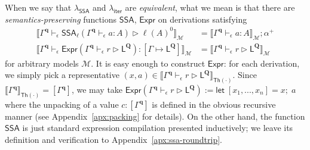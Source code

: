 \documentclass[acmsmall,screen,review]{acmart}
\newcommand{\mc}[1]{\ensuremath{\mathcal{#1}}}
\newcommand{\mb}[1]{\ensuremath{\mathbf{#1}}}
\newcommand{\ms}[1]{\ensuremath{\mathsf{#1}}}
\newcommand{\letexpr}[3]{\ensuremath{\ms{let}\;#1 = #2;\;#3}}
\newcommand{\hasty}[4]{#1 \vdash_{#2} #3: {#4}}
\newcommand{\haslb}[4]{#1 \vdash_{#2} #3 \rhd #4}
\newcommand{\etoty}[1]{[#1]}
\newcommand{\ltoty}[2]{[#1 \mapsto #2]}
\newcommand{\dnt}[1]{\llbracket{#1}\rrbracket}
\newcommand{\subiterexp}{\texorpdfstring{\(\lambda_{\ms{iter}}\)}{lambda-iter}}
\newcommand{\isotopessa}{\(\lambda_{\ms{SSA}}\)}
\begin{document}
When we say that \isotopessa{} and \subiterexp{} are \emph{equivalent}, what we mean is that there
are \emph{semantics-preserving} functions $\ms{SSA}$, $\ms{Expr}$ on derivations satisfying
\begin{align*}
\dnt{
  \haslb{\Gamma^{\mb{q}}}{\epsilon}{\ms{SSA}_\ell(\hasty{\Gamma^{\mb{q}}}{\epsilon}{a}{A})}
  {\ell(A)^0}
}_{\mc{M}} &= \dnt{\hasty{\Gamma^{\mb{q}}}{\epsilon}{a}{A}}_{\mc{M}} ; \alpha^+ \\
\dnt{
  \hasty{\Gamma^{\mb{q}}}{\epsilon}
    {\ms{Expr}(\haslb{\Gamma^{\mb{q}}}{\epsilon}{r}{\ms{L}^{\mb{Q}}})}
    {\ltoty{\Gamma}{\ms{L}^{\mb{Q}}}}
}_{\mc{M}} &= \dnt{\haslb{\Gamma^{\mb{q}}}{\epsilon}{r}{\ms{L}^{\mb{Q}}}}_{\mc{M}}
\end{align*}
for arbitrary models $\mc{M}$. 
%
%
It is easy enough to construct $\ms{Expr}$: for each derivation,
we simply pick a representative 
$
  (x, a) \in 
  \dnt{\haslb{\Gamma^{\mb{q}}}{\epsilon}{r}{\ms{L}^{\mb{Q}}}}_{\ms{Th(\cdot)}}
$. Since $\dnt{\Gamma^{\mb{q}}}_{\ms{Th}(\cdot)} = \etoty{\Gamma^{\mb{q}}}$, we may take
$
\ms{Expr}(\haslb{\Gamma^{\mb{q}}}{\epsilon}{r}{\ms{L}^{\mb{Q}}}) := 
  \letexpr{[x_1,...,x_n]}{x}{a}
$
where the unpacking of a value $c : \etoty{\Gamma^{\mb{q}}}$ is defined in the obvious recursive
manner (see Appendix~\ref{apx:packing} for details). 
%
%
On the other hand, the function $\ms{SSA}$ is just standard expression compilation presented
inductively; we leave its definition and verification to Appendix~\ref{apx:ssa-roundtrip}. 
\end{document}
